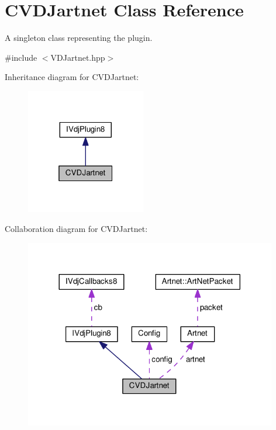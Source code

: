 \hypertarget{classCVDJartnet}{}\section{C\+V\+D\+Jartnet Class Reference}
\label{classCVDJartnet}


A singleton class representing the plugin.  




{\ttfamily \#include $<$V\+D\+Jartnet.\+hpp$>$}



Inheritance diagram for C\+V\+D\+Jartnet\+:
\nopagebreak
\begin{figure}[H]
\begin{center}
\leavevmode
\includegraphics[width=148pt]{classCVDJartnet__inherit__graph}
\end{center}
\end{figure}


Collaboration diagram for C\+V\+D\+Jartnet\+:
\nopagebreak
\begin{figure}[H]
\begin{center}
\leavevmode
\includegraphics[width=312pt]{classCVDJartnet__coll__graph}
\end{center}
\end{figure}
